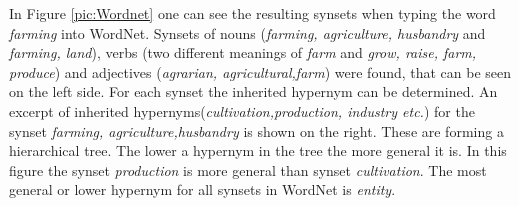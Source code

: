 In Figure \ref{pic:Wordnet} one can see the resulting synsets when typing the word \textit{farming} into WordNet. Synsets of nouns (\textit{farming, agriculture, husbandry} and \textit{farming, land}), verbs (two different meanings of \textit{farm} and \textit{grow, raise, farm, produce}) and adjectives (\textit{agrarian, agricultural,farm}) were found, that can be seen on the left side. For each synset the inherited hypernym can be determined. An excerpt of inherited hypernyms(\textit{cultivation,production, industry etc.}) for the synset \textit{farming, agriculture,husbandry} is shown on the right. These are forming a hierarchical tree. The lower a hypernym in the tree the more general it is. In this figure the synset \textit{production} is more general than synset \textit{cultivation}. The most general or lower hypernym for all synsets in WordNet is \textit{entity}. 
